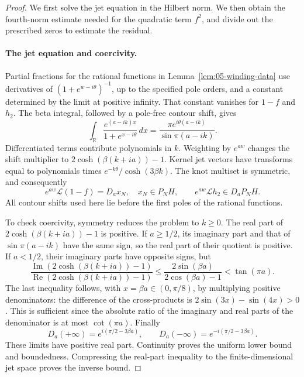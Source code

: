 \begin{proof}
We first solve the jet equation in the Hilbert norm. We then obtain the
fourth-norm estimate needed for the quadratic term \(f^2\), and divide
out the prescribed zeros to estimate the residual.

\paragraph{The jet equation and coercivity.}
Partial fractions for the rational functions in Lemma~\ref{lem:05-winding-data} use derivatives of
\((1+e^{w-i\theta})^{-1}\), up to the specified pole orders, and a constant determined by the limit at positive infinity. That constant vanishes for \(1-f\) and \(h_2\). The beta integral, followed by a pole-free contour shift, gives
\[
 \int_{\mathbb R}\frac{e^{(a-ik)x}}{1+e^{x-i\theta}}\,dx
   =\frac{\pi e^{i\theta(a-ik)}}{\sin\pi(a-ik)}.
\]
Differentiated terms contribute polynomials in \(k\). Weighting by \(e^{aw}\) changes the shift multiplier to \(2\cosh(\beta(k+ia))-1\). Kernel jet vectors have transforms equal to polynomials times \(e^{-k\theta}/\cosh(3\beta k)\). The knot multiset is symmetric, and consequently
\begin{equation}
 e^{aw}\mathscr L(1-f)=D_ax_N,
 \quad x_N\in P_NH,
 \qquad
 e^{aw}\mathscr Lh_2\in D_aP_NH.
 \label{eq:05-partial-fractions}
\end{equation}
All contour shifts used here lie before the first poles of the rational functions.

To check coercivity, symmetry reduces the problem to \(k\ge0\). The real part of \(2\cosh(\beta(k+ia))-1\) is positive. If \(a\ge1/2\), its imaginary part and that of \(\sin\pi(a-ik)\) have the same sign, so the real part of their quotient is positive. If \(a<1/2\), their imaginary parts have opposite signs, but
\[
 \frac{\operatorname{Im}(2\cosh(\beta(k+ia))-1)}
      {\operatorname{Re}(2\cosh(\beta(k+ia))-1)}
 \le\frac{2\sin(\beta a)}{2\cos(\beta a)-1}
 <\tan(\pi a).
\]
The last inequality follows, with \(x=\beta a\in(0,\pi/8)\), by multiplying positive denominators: the difference of the cross-products is \(2\sin(3x)-\sin(4x)>0\). This is sufficient since the absolute ratio of the imaginary and real parts of the denominator is at most \(\cot(\pi a)\). Finally
\[
 D_a(+\infty)=e^{i(\pi/2-3\beta a)},\qquad
 D_a(-\infty)=e^{-i(\pi/2-3\beta a)}.
\]
These limits have positive real part. Continuity proves the uniform lower bound and boundedness. Compressing the real-part inequality to the finite-dimensional jet space proves the inverse bound.


\end{proof}
